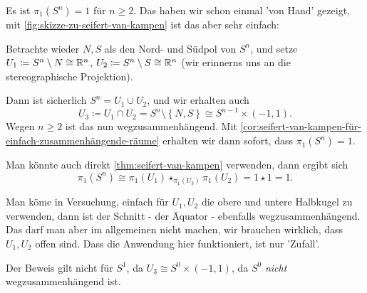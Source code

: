 \begin{example}
    Es ist $\pi_1(S^n) = 1$ für $n\geq 2$. Das haben wir schon einmal 'von Hand' gezeigt, mit \autoref{fig:skizze-zu-seifert-van-kampen} ist das aber sehr einfach:

    Betrachte wieder $N,S$ als den Nord- und Südpol von  $S^n$, und setze  $U_1 \coloneqq  S^n \setminus N\cong \mathbb{R}^n$, $U_2 \coloneqq  S^n \setminus S \cong \mathbb{R}^n$ (wir erinnerns uns an die stereographische Projektion).

    Dann ist sicherlich $S^n = U_1 \cup U_2$, und wir erhalten auch
    \[
        U_3 \coloneqq  U_1 \cap  U_2 = S^n \setminus \left \{N,S\right\} \cong S^{n-1} \times (-1,1)
    .\] 
    Wegen $n\geq 2$ ist das nun wegzusammenhängend. Mit \autoref{cor:seifert-van-kampen-für-einfach-zusammenhängende-räume} erhalten wir dann sofort, dass $\pi_1(S^n) = 1$.

    Man könnte auch direkt \autoref{thm:seifert-van-kampen} verwenden, dann ergibt sich
    \[
        \pi_1(S^n) \cong \pi_1(U_1) \star_{\pi_1(U_3)} \pi_1(U_2) = 1 \star 1 = 1
    .\] 
    \begin{oral}
        Man köme in Versuchung, einfach für $U_1,U_2$ die obere und untere Halbkugel zu verwenden, dann ist der Schnitt - der Äquator - ebenfalls wegzusammenhängend. Das darf man aber im allgemeinen nicht machen, wir brauchen wirklich, dass $U_1,U_2$ offen sind. Dass die Anwendung hier funktioniert, ist nur 'Zufall'.
    \end{oral}
    \begin{warning}
        Der Beweis gilt nicht für $S^1$, da  $U_3 \cong S^0 \times  (-1,1)$, da $S^0$ \textit{nicht} wegzusammenhängend ist.
    \end{warning}
\end{example}

